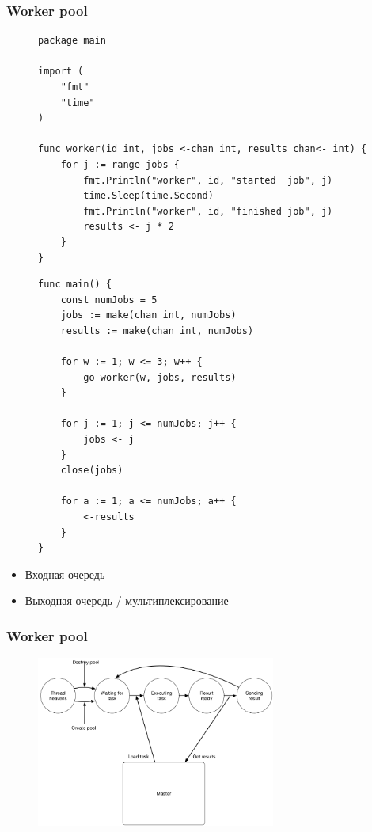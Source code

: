 \documentclass[aspectratio=169, pdf, 8pt, unicode]{beamer}
\begin{document}
\begin{frame}[fragile]
\frametitle{Worker pool}
\begin{figure}[H]
\centering
\begin{minipage}{0.5\textwidth}
\small
\begin{verbatim}
package main

import (
    "fmt"
    "time"
)

func worker(id int, jobs <-chan int, results chan<- int) {
    for j := range jobs {
        fmt.Println("worker", id, "started  job", j)
        time.Sleep(time.Second)
        fmt.Println("worker", id, "finished job", j)
        results <- j * 2
    }
}
\end{verbatim}
\end{minipage}%
\begin{minipage}{0.4\textwidth}
\small
\begin{verbatim}
func main() {
    const numJobs = 5
    jobs := make(chan int, numJobs)
    results := make(chan int, numJobs)

    for w := 1; w <= 3; w++ {
        go worker(w, jobs, results)
    }

    for j := 1; j <= numJobs; j++ {
        jobs <- j
    }
    close(jobs)

    for a := 1; a <= numJobs; a++ {
        <-results
    }
}
\end{verbatim}
\end{minipage}
\end{figure}
\begin{itemize}
\item Входная очередь
\item Выходная очередь / мультиплексирование
\end{itemize}
\end{frame}

\begin{frame}
\frametitle{Worker pool}
\begin{figure}[H]
\includegraphics[width=0.7\textwidth]{fig/thread-pool-states.png}
\end{figure}
\end{frame}
\end{document}
